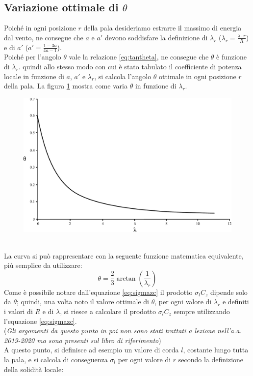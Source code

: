 \subsection{Variazione ottimale di $\theta$}
Poiché in ogni posizione $r$ della pala desideriamo estrarre il massimo di energia dal vento, ne consegue che $a$ e $a'$ devono soddisfare la definizione di $\lambda_r$ ($\lambda_r = \frac{\lambda \cdot r}{R}$) e di $a'$ ($a' = \frac{1 - 3a}{4a -1}$).\\
Poiché per l'angolo $\theta$ vale la relazione \ref{eq:tantheta}, ne consegue che $\theta$ è funzione di $\lambda_r$. quindi allo stesso modo con cui è stato tabulato il coefficiente di potenza locale in funzione di $a$, $a'$ e $\lambda_r$, si calcola l'angolo $\theta$ ottimale in ogni posizione $r$ della pala. La figura \ref{fig:lambdatheta} mostra come varia $\theta$ in funzione di $\lambda_r$.
\begin{figure}[h!]
\centering
  \includegraphics[width=.7\textwidth]{fig/lambdatheta.pdf}
\caption{}
\label{fig:lambdatheta}
\end{figure}
\\La curva si può rappresentare con la seguente funzione matematica equivalente, più semplice da utilizzare:
\begin{equation}
\theta = \frac{2}{3} \arctan \left( \frac{1}{\lambda_r} \right)
\end{equation}
Come è possibile notare dall'equazione \ref{eq:sigmazc} il prodotto $\sigma_l C_z$ dipende solo da $\theta$; quindi, una volta noto il valore ottimale di $\theta$, per ogni valore di $\lambda_r$ e definiti i valori di $R$ e di $\lambda$, si riesce a calcolare il prodotto $\sigma_l C_z$ sempre utilizzando l'equazione \ref{eq:sigmazc}.\\
(\textit{Gli argomenti da questo punto in poi non sono stati trattati a lezione nell'a.a. 2019-2020 ma sono presenti sul libro di riferimento})\\
A questo punto, si definisce ad esempio un valore di corda $l$, costante lungo  tutta la pala, e si calcola di conseguenza $\sigma_l$ per ogni valore di $r$ secondo la definizione della solidità locale:
